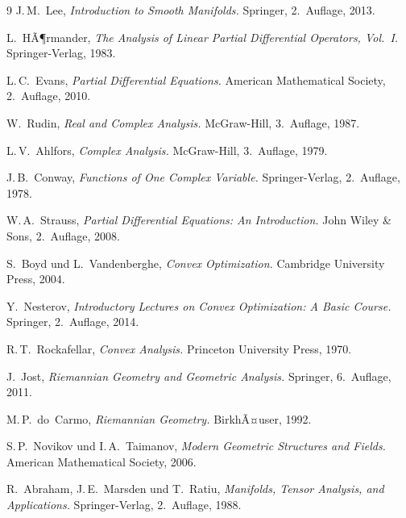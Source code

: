 ﻿\documentclass[12pt, a4paper]{article}
\theoremstyle{definition}
\begin{document}
\begin{thebibliography}{9}
		J.\,M.~Lee,
		\newblock \emph{Introduction to Smooth Manifolds.}
		\newblock Springer, 2.~Auflage, 2013.
		
		L.~HÃ¶rmander,
		\newblock \emph{The Analysis of Linear Partial Differential Operators, Vol.~I.}
		\newblock Springer-Verlag, 1983.
		
		L.\,C.~Evans,
		\newblock \emph{Partial Differential Equations.}
		\newblock American Mathematical Society, 2.~Auflage, 2010.
		
		W.~Rudin,
		\newblock \emph{Real and Complex Analysis.}
		\newblock McGraw-Hill, 3.~Auflage, 1987.
		
		L.\,V.~Ahlfors,
		\newblock \emph{Complex Analysis.}
		\newblock McGraw-Hill, 3.~Auflage, 1979.
		
		J.\,B.~Conway,
		\newblock \emph{Functions of One Complex Variable.}
		\newblock Springer-Verlag, 2.~Auflage, 1978.
		
		W.\,A.~Strauss,
		\newblock \emph{Partial Differential Equations: An Introduction.}
		\newblock John Wiley \& Sons, 2.~Auflage, 2008.
		
		S.~Boyd und L.~Vandenberghe,
		\newblock \emph{Convex Optimization.}
		\newblock Cambridge University Press, 2004.
		
		Y.~Nesterov,
		\newblock \emph{Introductory Lectures on Convex Optimization: A Basic Course.}
		\newblock Springer, 2.~Auflage, 2014.
		
		R.\,T.~Rockafellar,
		\newblock \emph{Convex Analysis.}
		\newblock Princeton University Press, 1970.
		
		J.~Jost,
		\newblock \emph{Riemannian Geometry and Geometric Analysis.}
		\newblock Springer, 6.~Auflage, 2011.
		
		M.\,P.~do~Carmo,
		\newblock \emph{Riemannian Geometry.}
		\newblock BirkhÃ¤user, 1992.
		
		S.\,P.~Novikov und I.\,A.~Taimanov,
		\newblock \emph{Modern Geometric Structures and Fields.}
		\newblock American Mathematical Society, 2006.
		
		R.~Abraham, J.\,E.~Marsden und T.~Ratiu,
		\newblock \emph{Manifolds, Tensor Analysis, and Applications.}
		\newblock Springer-Verlag, 2.~Auflage, 1988.
		

\end{thebibliography}
\end{document}
